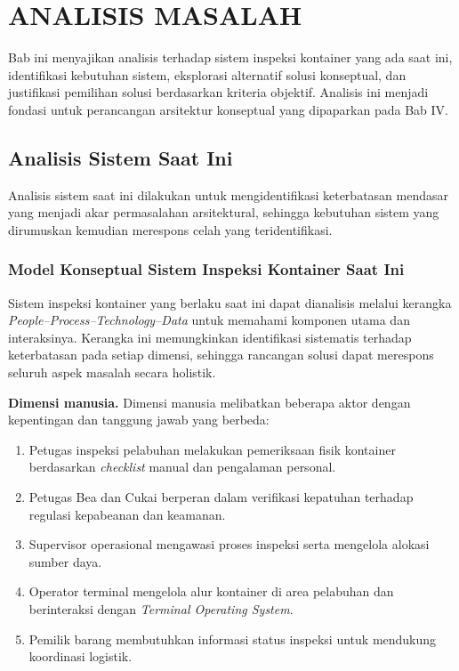 \cleardoublepage
\chapter{ANALISIS MASALAH}
\label{chap:analisis-masalah}

Bab ini menyajikan analisis terhadap sistem inspeksi kontainer yang ada saat
ini, identifikasi kebutuhan sistem, eksplorasi alternatif solusi konseptual, dan
justifikasi pemilihan solusi berdasarkan kriteria objektif. Analisis ini menjadi
fondasi untuk perancangan arsitektur konseptual yang dipaparkan pada Bab IV.

\section{Analisis Sistem Saat Ini}

Analisis sistem saat ini dilakukan untuk mengidentifikasi keterbatasan mendasar yang menjadi akar permasalahan arsitektural, sehingga kebutuhan sistem yang dirumuskan kemudian merespons celah yang teridentifikasi.

\subsection{Model Konseptual Sistem Inspeksi Kontainer Saat Ini}

Sistem inspeksi kontainer yang berlaku saat ini dapat dianalisis melalui kerangka \textit{People–Process–Technology–Data} untuk memahami komponen utama dan interaksinya. Kerangka ini memungkinkan identifikasi sistematis terhadap keterbatasan pada setiap dimensi, sehingga rancangan solusi dapat merespons seluruh aspek masalah secara holistik.

\textbf{Dimensi manusia.}
Dimensi manusia melibatkan beberapa aktor dengan kepentingan dan tanggung jawab
yang berbeda:

\begin{enumerate}
  \item Petugas inspeksi pelabuhan melakukan pemeriksaan fisik kontainer
  berdasarkan \textit{checklist} manual dan pengalaman personal.
  \item Petugas Bea dan Cukai berperan dalam verifikasi kepatuhan terhadap
  regulasi kepabeanan dan keamanan.
  \item Supervisor operasional mengawasi proses inspeksi serta mengelola
  alokasi sumber daya.
  \item Operator terminal mengelola alur kontainer di area pelabuhan dan
  berinteraksi dengan \textit{Terminal Operating System}.
  \item Pemilik barang membutuhkan informasi status inspeksi untuk mendukung
  koordinasi logistik.
\end{enumerate}

